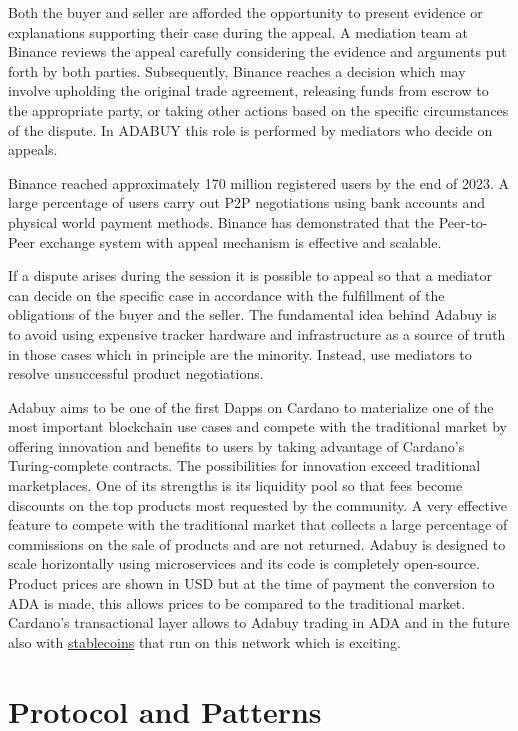 \documentclass[12pt]{article}
\begin{document}
Both the buyer and seller are afforded the opportunity to present evidence or explanations supporting their case during the appeal. A mediation team at Binance reviews the appeal carefully considering the evidence and arguments put forth by both parties. Subsequently, Binance reaches a decision which may involve upholding the original trade agreement, releasing funds from escrow to the appropriate party, or taking other actions based on the specific circumstances of the dispute. In ADABUY this role is performed by mediators who decide on appeals.

Binance reached approximately 170 million registered users by the end of 2023. A large percentage of users carry out P2P negotiations using bank accounts and physical world payment methods. Binance has demonstrated that the Peer-to-Peer exchange system with appeal mechanism is effective and scalable.

If a dispute arises during the session it is possible to appeal so that a mediator can decide on the specific case in accordance with the fulfillment of the obligations of the buyer and the seller. The fundamental idea behind Adabuy is to avoid using expensive tracker hardware and infrastructure as a source of truth in those cases which in principle are the minority. Instead, use mediators to resolve unsuccessful product negotiations.

Adabuy aims to be one of the first Dapps on Cardano to materialize one of the most important blockchain use cases and compete with the traditional market by offering innovation and benefits to users by taking advantage of Cardano's Turing-complete contracts. The possibilities for innovation exceed traditional marketplaces. One of its strengths is its liquidity pool so that fees become discounts on the top products most requested by the community. 
A very effective feature to compete with the traditional market that collects a large percentage of commissions on the sale of products and are not returned. Adabuy is designed to scale horizontally using microservices and its code is completely open-source.
Product prices are shown in USD but at the time of payment the conversion to ADA is made, this allows prices to be compared to the traditional market. Cardano's transactional layer allows to Adabuy trading in ADA and in the future also with \underline{stablecoins} that run on this network which is exciting.

\section{ Protocol and Patterns }
\end{document}
